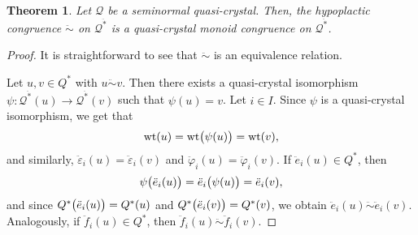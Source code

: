 \documentclass[a4paper,reqno]{amsart}
\numberwithin{equation}{section}
\theoremstyle{plain}
\newtheorem{thm}{Theorem}[section]
\theoremstyle{definition}
\theoremstyle{remark}
\DeclarePairedDelimiter{\parens}{\lparen}{\rparen}
\DeclareMathOperator{\wt}{wt}
\newcommand*{\qcrst}[1]{\mathcal{#1}}
\newcommand*{\qcrstQ}{\qcrst{Q}}
\newcommand*{\qKoe}{\ddot{e}}
\newcommand*{\qKof}{\ddot{f}}
\newcommand*{\qKoec}{\ddot{\varepsilon}}
\newcommand*{\qKofc}{\ddot{\varphi}}
\newcommand*{\fqcms}{{\ddot{*}}}      %
\newcommand*{\hyco}{\mathrel{\ddot{\sim}}}
\begin{document}
\begin{thm}
\label{thm:hycoqcmc}
Let $\qcrstQ$ be a seminormal quasi-crystal.
Then, the hypoplactic congruence $\hyco$ on $\qcrstQ^\fqcms$ is a quasi-crystal monoid congruence on $\qcrstQ^\fqcms$.
\end{thm}

\begin{proof}
It is straightforward to see that $\hyco$ is an equivalence relation.

  Let $u, v \in Q^*$ with $u \hyco v$. Then there exists a quasi-crystal isomorphism $\psi : \qcrstQ^\fqcms (u) \to \qcrstQ^\fqcms (v)$ such that $\psi (u) = v$.
Let $i \in I$. Since $\psi$ is a quasi-crystal isomorphism, we get that
\[ \wt (u) = \wt \parens[\big]{\psi (u)} = \wt (v), \]
and similarly, $\qKoec_i (u) = \qKoec_i (v)$ and $\qKofc_i (u) = \qKofc_i (v)$.
If $\qKoe_i (u) \in Q^*$, then
\[ \psi \parens[\big]{\qKoe_i (u)} = \qKoe_i \parens[\big]{\psi (u)} = \qKoe_i (v), \]
and since $Q^* \parens[\big]{ \qKoe_i (u) } = Q^* (u)$ and $Q^* \parens[\big]{ \qKoe_i (v) } = Q^* (v)$, we obtain $\qKoe_i (u) \hyco \qKoe_i (v)$.
Analogously, if $\qKof_i (u) \in Q^*$, then $\qKof_i (u) \hyco \qKof_i (v)$.


\end{proof}
\end{document}
